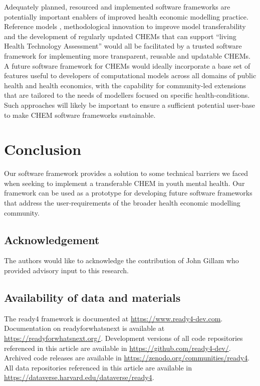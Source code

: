 \documentclass[sn-vancouver,Numbered,pdflatex]{sn-jnl}
\theoremstyle{remark}
\theoremstyle{definition}
\begin{document}
Adequately planned, resourced and implemented software frameworks are potentially important enablers of improved health economic modelling practice. Reference models \citep{Afzali2013}, methodological innovation to improve model transferability \citep{craig2018taking} and the development of regularly updated CHEMs that can support ``living Health Technology Assessment'' \citep{thokala2023living} would all be facilitated by a trusted software framework for implementing more transparent, reusable and updatable CHEMs. A future software framework for CHEMs would ideally incorporate a base set of features useful to developers of computational models across all domains of public health and health economics, with the capability for community-led extensions that are tailored to the needs of modellers focused on specific health-conditions. Such approaches will likely be important to ensure a sufficient potential user-base to make CHEM software frameworks sustainable.

\hypertarget{conclusion}{%
\section{Conclusion}\label{conclusion}}

Our software framework provides a solution to some technical barriers we faced when seeking to implement a transferable CHEM in youth mental health. Our framework can be used as a prototype for developing future software frameworks that address the user-requirements of the broader health economic modelling community.

\hypertarget{acknowledgement}{%
\subsection*{Acknowledgement}\label{acknowledgement}}

The authors would like to acknowledge the contribution of John Gillam who provided advisory input to this research.

\hypertarget{availability-of-data-and-materials}{%
\subsection*{Availability of data and materials}\label{availability-of-data-and-materials}}

The ready4 framework is documented at \url{https://www.ready4-dev.com}. Documentation on readyforwhatsnext is available at \url{https://readyforwhatsnext.org/}. Development versions of all code repositories referenced in this article are available in \url{https://github.com/ready4-dev/}. Archived code releases are available in \url{https://zenodo.org/communities/ready4}. All data repositories referenced in this article are available in \url{https://dataverse.harvard.edu/dataverse/ready4}.
\end{document}
